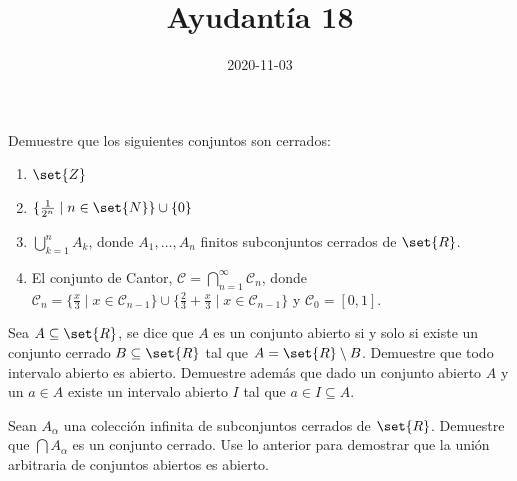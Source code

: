 \documentclass{ayudantia}
\title{Ayudantía 18}
\date{2020-11-03}
\begin{document}
\maketitle

\begin{prob}
    Demuestre que los siguientes conjuntos son cerrados:
    \begin{enumerate}[label=(\alph*)]
        \item \(\set{Z}\)
        \item \(\{\frac1{2^n}\mid n\in\set{N}\}\cup\{0\}\)
        \item \(\bigcup_{k=1}^nA_k\), donde \(A_1,\ldots, A_n\) finitos subconjuntos cerrados de \(\set{R}\).
        \item El conjunto de Cantor, \(\mathcal{C}=\bigcap_{n=1}^\infty\mathcal{C}_n\), donde  \(\mathcal{C}_n=\{\frac{x}3\mid x\in\mathcal{C}_{n-1}\}\cup\{\frac23+\frac{x}3\mid x\in\mathcal{C}_{n-1}\}\) y \(\mathcal{C}_0=[0,1]\).
    \end{enumerate}
\end{prob}

\begin{ans}
    \begin{sol}

    \end{sol}
\end{ans}



\begin{prob}
    Sea \(A\subseteq\set{R}\), se dice que \(A\) es un conjunto abierto si y solo si existe un conjunto cerrado \(B\subseteq\set{R}\) tal que \(A=\set{R}\setminus B\). Demuestre que todo intervalo abierto es abierto. Demuestre además que dado un conjunto abierto \(A\) y un \(a\in A\) existe un intervalo abierto \(I\) tal que \(a\in I\subseteq A\).
\end{prob}

\begin{ans}
    \begin{sol}

    \end{sol}
\end{ans}



\begin{prob}
    Sean \(A_\alpha\) una colección infinita de subconjuntos cerrados de \(\set{R}\). Demuestre que \(\bigcap A_\alpha\) es un conjunto cerrado. Use lo anterior para demostrar que la unión arbitraria de conjuntos abiertos es abierto.
\end{prob}

\begin{ans}
    \begin{sol}

    \end{sol}
\end{ans}
\end{document}

